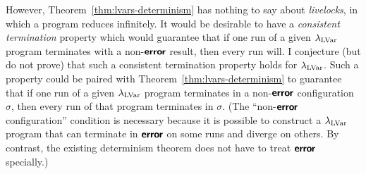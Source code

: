 However, Theorem~\ref{thm:lvars-determinism} has nothing to say about
\emph{livelocks}, in which a program reduces infinitely.  It would be
desirable to have a \emph{consistent termination} property which would
guarantee that if one run of a given $\lambda_{\textrm{LVar}}$ program terminates
with a non-$\textbf{\textsf{error}}$ result, then every run will.  I conjecture (but do
not prove) that such a consistent termination property holds for
$\lambda_{\textrm{LVar}}$.  Such a property could be paired with
Theorem~\ref{thm:lvars-determinism} to guarantee that if one run of a
given $\lambda_{\textrm{LVar}}$ program terminates in a non-$\textbf{\textsf{error}}$ configuration
$\sigma$, then every run of that program terminates in $\sigma$.  (The
``non-$\textbf{\textsf{error}}$ configuration'' condition is necessary because it is
possible to construct a $\lambda_{\textrm{LVar}}$ program that can terminate in
$\textbf{\textsf{error}}$ on some runs and diverge on others.  By contrast, the
existing determinism theorem does not have to treat $\textbf{\textsf{error}}$
specially.)

